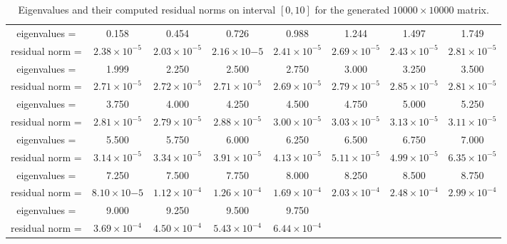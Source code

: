 \begin{table*}
\begin{center}
\begin{tabular}{|c|c|c|c|c|c|c|c|}
\hline
eigenvalues =  & 0.158 & 0.454 & 0.726& 0.988 &1.244 &1.497& 1.749 \\ 
residual norm =  & $2.38\times10^{-5}$ & $2.03\times10^{-5}$ & $2.16\times10{-5}$ & $2.41\times10^{-5}$ & $2.69\times10^{-5}$ & $2.43\times10^{-5}$ & $2.81\times10^{-5}$\\
\hline
\hline
eigenvalues = &1.999 & 2.250 & 2.500 & 2.750 & 3.000& 3.250& 3.500\\
residual norm =  &$2.71\times10^{-5}$ & $2.72\times10^{-5}$& $2.71\times10^{-5}$ &$2.69\times10^{-5}$ & $2.79\times10^{-5}$ &$2.85\times10^{-5}$&  $2.81\times10^{-5}$ \\
\hline
\hline
eigenvalues = &3.750 & 4.000 &4.250 & 4.500 & 4.750 & 5.000 & 5.250 \\
residual norm =  &$2.81\times10^{-5}$ & $2.79\times10^{-5}$ & $2.88\times10^{-5}$ & $3.00\times10^{-5}$ & $3.03\times10^{-5}$ & $3.13\times10^{-5}$ &$3.11\times10^{-5}$ \\
\hline
\hline
eigenvalues = &  5.500  & 5.750  & 6.000  & 6.250 & 6.500 & 6.750 & 7.000\\
residual norm = & $3.14\times10^{-5}$ &$3.34\times10^{-5}$ & $3.91\times10^{-5}$ & $4.13\times10^{-5}$ & $5.11\times10^{-5}$ & $4.99\times10^{-5}$ & $6.35\times10^{-5}$ \\
\hline
\hline
eigenvalues =  & 7.250 & 7.500 & 7.750 & 8.000 & 8.250 & 8.500 & 8.750   \\
residual norm = & $8.10\times10{-5}$ & $1.12\times10^{-4}$ & $1.26\times10^{-4}$ & $1.69\times10^{-4}$ & $2.03\times10^{-4}$ & $2.48\times10^{-4}$&  $2.99\times10^{-4}$ \\
\hline
\hline
eigenvalues =  & 9.000 & 9.250 & 9.500 & 9.750 &&&\\
residual norm = & $3.69\times10^{-4}$ &$4.50\times10^{-4}$ & $5.43\times10^{-4}$ & $6.44\times10^{-4}$&&&\\
\hline
\end{tabular}
\caption{Eigenvalues and their computed residual norms on interval $[0, 10]$ for the generated $10000 \times 10000$ matrix.}
\label{tab:eigs}
\end{center}
\end{table*}

